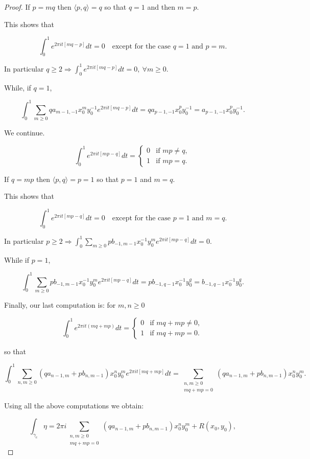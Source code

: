 \documentclass[11pt,a4paper]{amsart}
\theoremstyle{definition}
\begin{document}
\begin{proof}
If $p=mq$ then $\langle p,q\rangle=q$ so that
$q=1$ and then $m=p$.

This shows that

\[
\int_0^1 e^{2\pi it[mq-p]}dt=0
\quad \text{except for the case } q=1 \text{ and } p=m.
\]

In particular $q\ge2\Rightarrow
\int_0^1 e^{2\pi it[mq-p]}dt=0,\ \forall m\ge0.
$

While, if $q=1$,

\[
\int_0^1
\sum_{m\ge0}
q a_{m-1,-1}
x_0^my_0^{-1}
e^{2\pi it[mq-p]}dt
=
q a_{p-1,-1}x_0^py_0^{-1}
=
a_{p-1,-1}x_0^py_0^{-1}.
\]


We continue.

\[
\int_0^1 e^{2\pi it[mp-q]}dt
=
\begin{cases}
0 & \text{if } mp\neq q,\\
1 & \text{if } mp=q.
\end{cases}
\]

If $q=mp$ then $\langle p,q\rangle=p=1$ so that
$p=1$ and $m=q$.

This shows that

\[
\int_0^1 e^{2\pi it[mp-q]}dt=0
\quad \text{except for the case } p=1 \text{ and } m=q.
\]

In particular $p\ge2\Rightarrow
\int_0^1
\sum_{m\ge0}
p b_{-1,m-1}
x_0^{-1}y_0^m
e^{2\pi it[mp-q]}dt
=0.
$

While if $p=1$,

\[
\int_0^1
\sum_{m\ge0}
p b_{-1,m-1}
x_0^{-1}y_0^m
e^{2\pi it[mp-q]}dt
=
p b_{-1,q-1}x_0^{-1}y_0^q
=
b_{-1,q-1}x_0^{-1}y_0^q.
\]

Finally, our last computation is: for $m,n\ge0$

\[
\int_0^1 e^{2\pi it(mq+mp)}dt
=
\begin{cases}
0 & \text{if } mq+mp\neq 0,\\
1 & \text{if } mq+mp=0.
\end{cases}
\]

so that

\[
\int_0^1
\sum_{n,m\ge0}
(q a_{n-1,m}+p b_{n,m-1})
x_0^n y_0^m
e^{2\pi it[mq+mp]}dt
=
\sum_{\substack{n,m\ge0\\ mq+mp=0}}
(q a_{n-1,m}+p b_{n,m-1})
x_0^n y_0^m.
\]

Using all the above computations we obtain:

\[
\int_{\gamma_c}\eta
=
2\pi i
\sum_{\substack{n,m\ge0\\ mq+mp=0}}
(q a_{n-1,m}+p b_{n,m-1})
x_0^n y_0^m
+
R(x_0,y_0),
\]


\end{proof}
\end{document}
